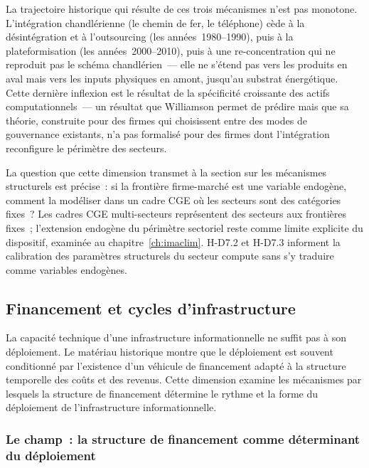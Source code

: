 La trajectoire historique qui résulte de ces trois mécanismes n'est pas monotone. L'intégration chandlérienne (le chemin de fer, le téléphone) cède à la désintégration et à l'outsourcing (les années~1980--1990), puis à la plateformisation (les années~2000--2010), puis à une re-concentration qui ne reproduit pas le schéma chandlérien~--- elle ne s'étend pas vers les produits en aval mais vers les inputs physiques en amont, jusqu'au substrat énergétique. Cette dernière inflexion est le résultat de la spécificité croissante des actifs computationnels~--- un résultat que Williamson permet de prédire mais que sa théorie, construite pour des firmes qui choisissent entre des modes de gouvernance existants, n'a pas formalisé pour des firmes dont l'intégration reconfigure le périmètre des secteurs.

La question que cette dimension transmet à la section sur les mécanismes structurels est précise~: si la frontière firme-marché est une variable endogène, comment la modéliser dans un cadre CGE où les secteurs sont des catégories fixes~? Les cadres CGE multi-secteurs représentent des secteurs aux frontières fixes~; l'extension endogène du périmètre sectoriel reste comme limite explicite du dispositif, examinée au chapitre~\ref{ch:imaclim}. H-D7.2 et H-D7.3 informent la calibration des paramètres structurels du secteur compute sans s'y traduire comme variables endogènes.


\clearpage
\subsection{Financement et cycles d'infrastructure}\label{sec:d8-finance}

La capacité technique d'une infrastructure informationnelle ne suffit pas à son déploiement. Le matériau historique montre que le déploiement est souvent conditionné par l'existence d'un véhicule de financement adapté à la structure temporelle des coûts et des revenus. Cette dimension examine les mécanismes par lesquels la structure de financement détermine le rythme et la forme du déploiement de l'infrastructure informationnelle.

\subsubsection{Le champ~: la structure de financement comme déterminant du déploiement}

